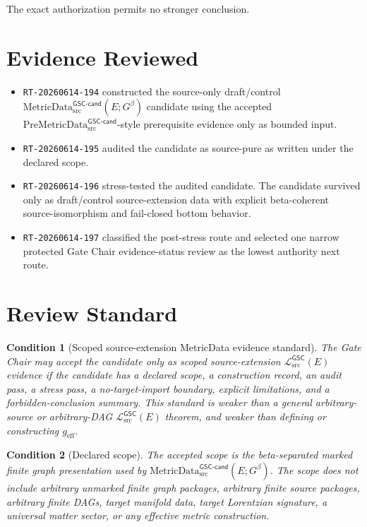\documentclass[11pt]{article}
\newcommand{\PreMetricData}{\mathrm{PreMetricData}_{\mathrm{src}}^{\mathsf{GSC\mbox{-}cand}}}
\newcommand{\MetricDataCand}{\mathrm{MetricData}_{\mathrm{src}}^{\mathsf{GSC\mbox{-}cand}}}
\newcommand{\MetricData}{\mathcal{L}_{\mathrm{src}}^{\mathsf{GSC}}}
\newcommand{\Gbeta}{G^{\beta}}
\newcommand{\geff}{g_{\mathrm{eff}}}
\newtheorem{condition}{Condition}
\begin{document}
The exact authorization permits no stronger conclusion.

\section{Evidence Reviewed}

\begin{itemize}[leftmargin=*]
  \item \texttt{RT-20260614-194} constructed the source-only draft/control
  \(\MetricDataCand(E;\Gbeta)\) candidate using the accepted
  \(\PreMetricData\)-style prerequisite evidence only as bounded input.
  \item \texttt{RT-20260614-195} audited the candidate as source-pure as
  written under the declared scope.
  \item \texttt{RT-20260614-196} stress-tested the audited candidate. The
  candidate survived only as draft/control source-extension data with explicit
  beta-coherent source-isomorphism and fail-closed bottom behavior.
  \item \texttt{RT-20260614-197} classified the post-stress route and selected
  one narrow protected Gate Chair evidence-status review as the lowest
  authority next route.
\end{itemize}

\section{Review Standard}

\begin{condition}[Scoped source-extension MetricData evidence standard]
The Gate Chair may accept the candidate only as scoped source-extension
\(\MetricData(E)\) evidence if the candidate has a declared scope, a
construction record, an audit pass, a stress pass, a no-target-import boundary,
explicit limitations, and a forbidden-conclusion summary. This standard is
weaker than a general arbitrary-source or arbitrary-DAG \(\MetricData(E)\)
theorem, and weaker than defining or constructing \(\geff\).
\end{condition}

\begin{condition}[Declared scope]
The accepted scope is the beta-separated marked finite graph presentation used
by \(\MetricDataCand(E;\Gbeta)\). The scope does not include arbitrary unmarked
finite graph packages, arbitrary finite source packages, arbitrary finite
DAGs, target manifold data, target Lorentzian signature, a universal matter
sector, or any effective metric construction.
\end{condition}
\end{document}
